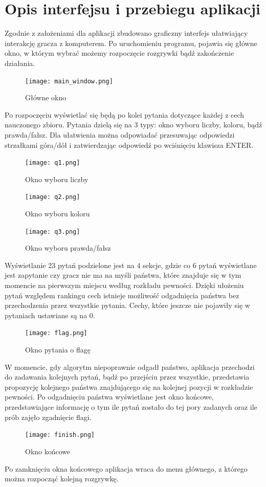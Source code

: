 \section{Opis interfejsu i przebiegu aplikacji}

Zgodnie z założeniami dla aplikacji zbudowano graficzny interfejs ułatwiający interakcję gracza z komputerem. Po uruchomieniu programu, pojawia się główne okno, w którym wybrać możemy rozpoczęcie rozgrywki bądź zakończenie działania.

\begin{figure}[h!]
	\centering
	\texttt{[image: main\_window.png]}
	\label{main-window}
	\caption{Główne okno}
\end{figure}

Po rozpoczęciu wyświetlać się będą po kolei pytania dotyczące każdej z cech nauczonego zbioru. Pytania dzielą się na 3 typy: okno wyboru liczby, koloru, bądź prawda/fałsz. Dla ułatwienia można odpowiadać przesuwając odpowiedzi strzałkami góra/dół i zatwierdzając odpowiedź po wciśnięciu klawisza ENTER.

\begin{figure}[h!]
	\centering
	\texttt{[image: q1.png]}
	\label{q1}
	\caption{Okno wyboru liczby}
\end{figure}

\begin{figure}[h!]
	\centering
	\texttt{[image: q2.png]}
	\label{q2}
	\caption{Okno wyboru koloru}
\end{figure}

\newpage

\begin{figure}[h!]
	\centering
	\texttt{[image: q3.png]}
	\label{q3}
	\caption{Okno wyboru prawda/fałsz}
\end{figure}

Wyświetlanie 23 pytań podzielone jest na 4 sekcje, gdzie co 6 pytań wyświetlane jest zapytanie czy gracz nie ma na myśli państwa, które znajduje się w tym momencie na pierwszym miejscu według rozkładu pewności. Dzięki ułożeniu pytań względem rankingu cech istnieje możliwość odgadnięcia państwa bez przechodzenia przez wszystkie pytania. Cechy, które jeszcze nie pojawiły się w pytaniach ustawiane są na 0.

\begin{figure}[h!]
	\centering
	\texttt{[image: flag.png]}
	\label{flag}
	\caption{Okno pytania o flagę}
\end{figure}

W momencie, gdy algorytm niepoprawnie odgadł państwo, aplikacja przechodzi do zadawania kolejnych pytań, bądź po przejściu przez wszystkie, przedstawia propozycję kolejnego państwa znajdującego się na kolejnej pozycji w rozkładzie pewności. Po odgadnięciu państwa wyświetlane jest okno końcowe, przedstawiające informację o tym ile pytań zostało do tej pory zadanych oraz ile prób zajęło zgadnięcie flagi.

\begin{figure}[h!]
	\centering
	\texttt{[image: finish.png]}
	\label{finish}
	\caption{Okno końcowe}
\end{figure}

Po zamknięciu okna końcowego aplikacja wraca do menu głównego, z którego można rozpocząć kolejną rozgrywkę.
